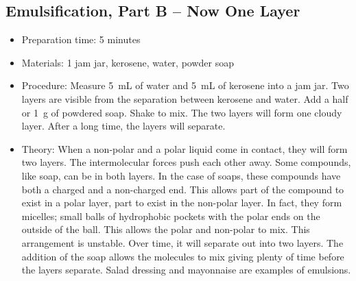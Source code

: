 \subsection{Emulsification, Part B -- Now One Layer}
\begin{itemize}
\item{Preparation time: 5 minutes}
\item{Materials: 1 jam jar, kerosene, water, powder soap}
\item{Procedure: Measure 5~mL of water and 5~mL of kerosene into a jam jar. Two layers are visible from the separation between kerosene and water. Add a half or 1~g of powdered soap. Shake to mix. The two layers will form one cloudy layer. After a long time, the layers will separate.}
\item{Theory: When a non-polar and a polar liquid come in contact, they will form two layers. The intermolecular forces push each other away. Some compounds, like soap, can be in both layers. In the case of soaps, these compounds have both a charged and a non-charged end. This allows part of the compound to exist in a polar layer, part to exist in the non-polar layer. In fact, they form micelles; small balls of hydrophobic pockets with the polar ends on the outside of the ball. This allows the polar and non-polar to mix. This arrangement is unstable. Over time, it will separate out into two layers. The addition of the soap allows the molecules to mix giving plenty of time before the layers separate. Salad dressing and mayonnaise are examples of emulsions.}
\end{itemize}

